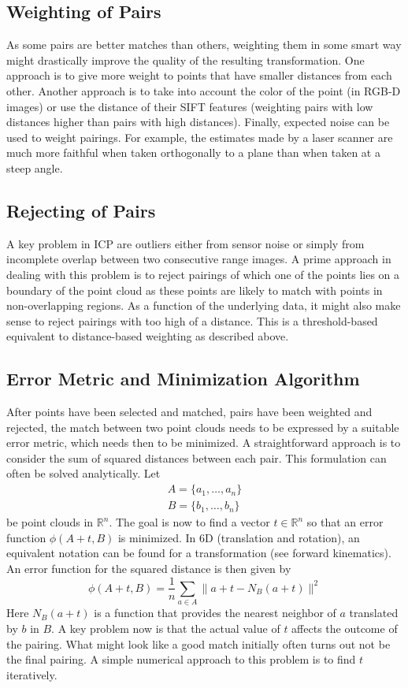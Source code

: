 \documentclass[paper=6.14in:9.21in,pagesize=pdftex,11pt,twoside,openright]{scrbook}
\begin{document}
\subsection{Weighting of Pairs}
As some pairs are better matches than others, weighting them in some smart way might drastically improve the quality of the resulting transformation. One approach is to give more weight to points that have smaller distances from each other. Another approach is to take into account the color of the point (in RGB-D images) or use the distance of their SIFT features (weighting pairs with low distances higher than pairs with high distances). Finally, expected noise can be used to weight pairings. For example, the estimates made by a laser scanner are much more faithful when taken orthogonally to a plane than when taken at a steep angle.

\subsection{Rejecting of Pairs}
A key problem in ICP are outliers either from sensor noise or simply from incomplete overlap between two consecutive range images. A prime approach in dealing with this problem is to reject pairings of which one of the points lies on a boundary of the point cloud as these points are likely to match with points in non-overlapping regions. As a function of the underlying data, it might also make sense to reject pairings with too high of a distance. This is a threshold-based equivalent to distance-based weighting as described above.

\subsection{Error Metric and Minimization Algorithm}
After points have been selected and matched, pairs have been weighted and rejected, the match between two point clouds needs to be expressed by a suitable error metric, which needs then to be minimized. A straightforward approach is to consider the sum of squared distances between each pair. This formulation can often be solved analytically. Let
\begin{eqnarray}
A=\{a_1,\ldots,a_n\}\\
B=\{b_1,\dots,b_n\}
\end{eqnarray}
be point clouds in $ \mathbb{R}^n$. The goal is now to find a vector $ t \in \mathbb{R}^n$ so that an error function $ \phi(A+t,B)$ is minimized. In 6D (translation and rotation), an equivalent notation can be found for a transformation (see forward kinematics). An error function for the squared distance is then given by
\begin{equation}
\phi(A+t,B)=\frac{1}{n}\sum_{a \in A}\|a+t-N_B(a+t)\|^2
\end{equation}
Here $ N_B(a+t)$ is a function that provides the nearest neighbor of $ a$ translated by $ b$ in $ B$.  A key problem now is that the actual value of $t$ affects the outcome of the pairing. What might look like a good match initially often turns out not be the final pairing. A simple numerical approach to this problem is to find $ t$ iteratively.
\end{document}
